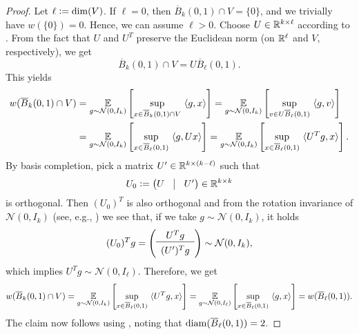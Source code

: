 \begin{proof}
Let $\ell \mathrel{\mathop:}= \dim(V)$. If $\ell = 0$, then $\overline{B}_k(0,1) \cap V = \{0\}$, and we trivially have $w(\{0\})= 0$. Hence, we can assume $\ell > 0$. Choose $U \in \mathbb{R}^{k \times \ell}$ according to . From the fact that $U$ and $U^T$ preserve the Euclidean norm (on $\mathbb{R}^\ell$ and $V$, respectively), we get 
\begin{equation*}
\overline{B}_k(0,1) \cap V = U\overline{B}_\ell(0,1).
\end{equation*}
This yields
\begin{align*}
w(\overline{B}_k(0,1) \cap V) &= \underset{g \sim \mathcal{N}(0, I_k)}{\mathbb{E}}   \left[\underset{x \in \overline{B}_k(0,1) \cap V}{\sup}\  \langle g, x \rangle \right]= \underset{g \sim \mathcal{N}(0, I_k)}{\mathbb{E}} \left[\underset{v \in U\overline{B}_\ell(0,1)}{\sup}\  \langle g, v \rangle \right]\\
&= \underset{g \sim \mathcal{N}(0, I_k)}{\mathbb{E}}  \left[\underset{x \in \overline{B}_\ell(0,1)}{\sup}\  \langle g, Ux \rangle \right]= \underset{g \sim \mathcal{N}(0, I_k)}{\mathbb{E}}  \left[ \underset{x \in \overline{B}_\ell(0,1)}{\sup}\  \langle U^Tg, x \rangle \right].
\end{align*}
By basis completion, pick a matrix $U' \in \mathbb{R}^{k \times (k - \ell)}$ such that 
\begin{equation*}
U_0 \defeq \begin{pmatrix} U & \vline & U'\end{pmatrix} \in \RR^{k \times k}
\end{equation*}
is orthogonal. 
Then $(U_0)^T$ is also orthogonal and from the rotation invariance of $\mathcal{N}(0, I_k)$ (see, e.g., \cite[Proposition~3.3.2]{vershynin_high-dimensional_2018}) we see that, if we take $g \sim \mathcal{N}(0,I_k)$, it holds
\begin{equation*}
(U_0)^T g = \left(\begin{array}{c} U^T g \\  \hline \vspace{-0.3cm}\\ (U')^T g\end{array}\right) \sim \mathcal{N}(0, I_k),
\end{equation*}
which implies $U^Tg \sim \mathcal{N}(0, I_\ell)$. Therefore, we get
\begin{equation*}
w(\overline{B}_k(0,1) \cap V) = \underset{g \sim \mathcal{N}(0, I_k)}{\mathbb{E}}  \left[ \underset{x \in \overline{B}_\ell(0,1)}{\sup}\  \langle U^Tg, x \rangle \right]= \underset{g \sim \mathcal{N}(0, I_\ell)}{\mathbb{E}}  \left[ \underset{x \in \overline{B}_\ell(0,1)}{\sup}\  \langle g, x \rangle \right]= w(\overline{B}_\ell(0,1)).
\end{equation*}
The claim now follows using \cite[Proposition~7.5.2]{vershynin_high-dimensional_2018}, noting that $\operatorname{diam}(\overline{B}_\ell(0,1)) = 2$.
\end{proof}
